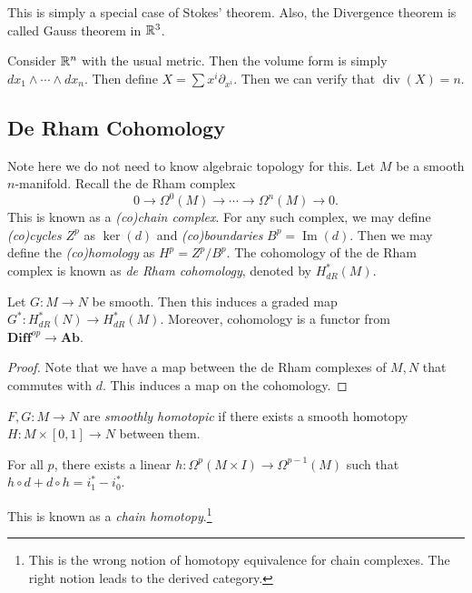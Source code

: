 \documentclass[twoside, 10pt]{article}
\begin{document}
    This is simply a special case of Stokes' theorem. Also, the Divergence
    theorem is called Gauss theorem in $\mathbb{R}^3$.

    \begin{exm} Consider $\mathbb{R}^n$ with the usual metric. Then the volume form is
    simply $dx_1 \wedge \cdots \wedge dx_n$. Then define $X = \sum x^i
\partial_{x^i}$. Then we can verify that $\operatorname{div}(X) = n$.
\end{exm}

    \subsection{De Rham Cohomology}%
    
    Note here we do not need to know algebraic topology for this. Let $M$ be a
    smooth $n$-manifold. Recall the de Rham complex \[ 0 \to \Omega^0(M) \to
    \cdots \to \Omega^n(M) \to 0.\] This is known as a \textit{(co)chain
    complex}. For any such complex, we may define \textit{(co)cycles} $Z^p$ as
    $\ker(d)$ and \textit{(co)boundaries} $B^p = \operatorname{Im}(d)$. Then we
    may define the \textit{(co)homology} as $H^p = Z^p/B^p$. The cohomology of
    the de Rham complex is known as \textit{de Rham cohomology}, denoted by
    $H^*_{dR}(M)$.

    \begin{prop} Let $G:M \to N$ be smooth. Then this induces a graded map
    $G^*: H^*_{dR}(N) \to H^*_{dR}(M)$. Moreover, cohomology is a functor from
$\mathbf{Diff}^{op} \to \mathbf{Ab}$.  \end{prop}

    \begin{proof} Note that we have a map between the de Rham complexes of $M,
    N$ that commutes with $d$. This induces a map on the cohomology.
\end{proof}

    \begin{defn} $F,G:M \to N$ are \textit{smoothly homotopic} if there exists
    a smooth homotopy $H:M \times [0,1] \to N$ between them.  \end{defn}

    \begin{lem} For all $p$, there exists a linear $h: \Omega^p(M \times I) \to
    \Omega^{p-1}(M)$ such that $h \circ d + d \circ h = i_1^* - i_0^*$.
\end{lem}

    \begin{rmk} This is known as a \textit{chain homotopy}.\footnote{This is
    the wrong notion of homotopy equivalence for chain complexes. The right
    notion leads to the derived category.} \end{rmk}
\end{document}
